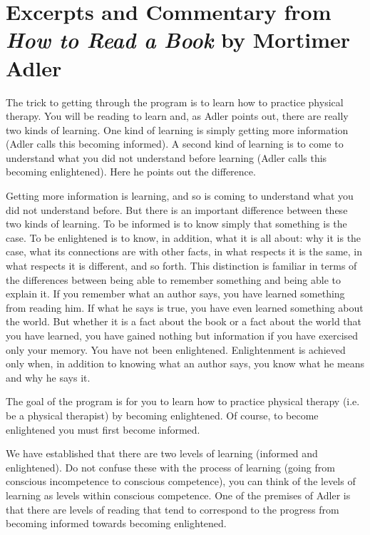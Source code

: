 

\section{Excerpts and Commentary from \textit{How to Read a Book} by Mortimer Adler}

The trick to getting through the program is to learn how to practice physical therapy. You will be reading to learn and, as Adler points out,  there are really two kinds of learning. One kind of learning is simply getting more information (Adler calls this becoming informed). A second kind of learning is to come to understand what you did not understand before learning (Adler calls this becoming enlightened). Here he points out the difference.
\begin{displayquote}
Getting more information is learning, and so is coming to understand what you did not understand before. But there is an important difference between these two kinds of learning. To be informed is to know simply that something is the case. To be enlightened is to know, in addition, what it is all about: why it is the case, what its connections are with other facts, in what respects it is the same, in what respects it is different, and so forth. This distinction is familiar in terms of the differences between being able to remember something and being able to explain it. If you remember what an author says, you have learned something from reading him. If what he says is true, you have even learned something about the world. But whether it is a fact about the book or a fact about the world that you have learned, you have gained nothing but information if you have exercised only your memory. You have not been enlightened. Enlightenment is achieved only when, in addition to knowing what an author says, you know what he means and why he says it.
\end{displayquote}


The goal of the program is for you to learn how to practice physical therapy (i.e. be a physical therapist) by becoming enlightened. Of course, to become enlightened you must first become informed.

We have established that there are two levels of learning (informed and enlightened). Do not confuse these with the process of learning (going from conscious incompetence to conscious competence), you can think of the levels of learning as levels within conscious competence. One of the premises of Adler is that there are levels of reading that tend to correspond to the progress from becoming informed towards becoming enlightened. 

